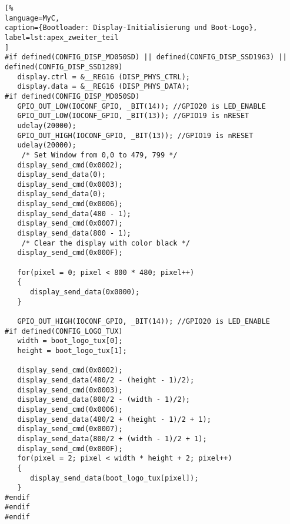 \begin{lstlisting}[%
language=MyC,
caption={Bootloader: Display-Initialisierung und Boot-Logo},
label=lst:apex_zweiter_teil
]
#if defined(CONFIG_DISP_MD050SD) || defined(CONFIG_DISP_SSD1963) || defined(CONFIG_DISP_SSD1289)
   display.ctrl = &__REG16 (DISP_PHYS_CTRL);   
   display.data = &__REG16 (DISP_PHYS_DATA); 
#if defined(CONFIG_DISP_MD050SD)
   GPIO_OUT_LOW(IOCONF_GPIO, _BIT(14)); //GPIO20 is LED_ENABLE
   GPIO_OUT_LOW(IOCONF_GPIO, _BIT(13)); //GPIO19 is nRESET
   udelay(20000);
   GPIO_OUT_HIGH(IOCONF_GPIO, _BIT(13)); //GPIO19 is nRESET
   udelay(20000);
	/* Set Window from 0,0 to 479, 799 */
   display_send_cmd(0x0002);			
   display_send_data(0);				
   display_send_cmd(0x0003);			
   display_send_data(0);				
   display_send_cmd(0x0006);
   display_send_data(480 - 1);
   display_send_cmd(0x0007);
   display_send_data(800 - 1);
	/* Clear the display with color black */
   display_send_cmd(0x000F);

   for(pixel = 0; pixel < 800 * 480; pixel++)
   {
      display_send_data(0x0000);
   }

   GPIO_OUT_HIGH(IOCONF_GPIO, _BIT(14)); //GPIO20 is LED_ENABLE
#if defined(CONFIG_LOGO_TUX)
   width = boot_logo_tux[0];
   height = boot_logo_tux[1];

   display_send_cmd(0x0002);
   display_send_data(480/2 - (height - 1)/2);
   display_send_cmd(0x0003);
   display_send_data(800/2 - (width - 1)/2);
   display_send_cmd(0x0006);
   display_send_data(480/2 + (height - 1)/2 + 1);
   display_send_cmd(0x0007);
   display_send_data(800/2 + (width - 1)/2 + 1);
   display_send_cmd(0x000F);
   for(pixel = 2; pixel < width * height + 2; pixel++)
   {
      display_send_data(boot_logo_tux[pixel]);
   }
#endif
#endif
#endif
\end{lstlisting}

